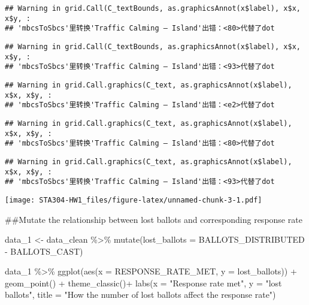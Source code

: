 \documentclass[
]{article}
\newenvironment{Shaded}{\begin{snugshade}}{\end{snugshade}}
\newcommand{\AttributeTok}[1]{\textcolor[rgb]{0.77,0.63,0.00}{#1}}
\newcommand{\FunctionTok}[1]{\textcolor[rgb]{0.00,0.00,0.00}{#1}}
\newcommand{\NormalTok}[1]{#1}
\newcommand{\OtherTok}[1]{\textcolor[rgb]{0.56,0.35,0.01}{#1}}
\newcommand{\SpecialCharTok}[1]{\textcolor[rgb]{0.00,0.00,0.00}{#1}}
\newcommand{\StringTok}[1]{\textcolor[rgb]{0.31,0.60,0.02}{#1}}
\begin{document}
\begin{verbatim}
## Warning in grid.Call(C_textBounds, as.graphicsAnnot(x$label), x$x, x$y, :
## 'mbcsToSbcs'里转换'Traffic Calming – Island'出错：<80>代替了dot
\end{verbatim}

\begin{verbatim}
## Warning in grid.Call(C_textBounds, as.graphicsAnnot(x$label), x$x, x$y, :
## 'mbcsToSbcs'里转换'Traffic Calming – Island'出错：<93>代替了dot
\end{verbatim}

\begin{verbatim}
## Warning in grid.Call.graphics(C_text, as.graphicsAnnot(x$label), x$x, x$y, :
## 'mbcsToSbcs'里转换'Traffic Calming – Island'出错：<e2>代替了dot
\end{verbatim}

\begin{verbatim}
## Warning in grid.Call.graphics(C_text, as.graphicsAnnot(x$label), x$x, x$y, :
## 'mbcsToSbcs'里转换'Traffic Calming – Island'出错：<80>代替了dot
\end{verbatim}

\begin{verbatim}
## Warning in grid.Call.graphics(C_text, as.graphicsAnnot(x$label), x$x, x$y, :
## 'mbcsToSbcs'里转换'Traffic Calming – Island'出错：<93>代替了dot
\end{verbatim}

\texttt{[image: STA304-HW1\_files/figure-latex/unnamed-chunk-3-1.pdf]}

\#\#Mutate the relationship between lost ballots and corresponding
response rate

\begin{Shaded}
\begin{Highlighting}[]
\NormalTok{data\_1 }\OtherTok{\textless{}{-}}\NormalTok{ data\_clean }\SpecialCharTok{\%\textgreater{}\%}
  \FunctionTok{mutate}\NormalTok{(}\AttributeTok{lost\_ballots =}\NormalTok{ BALLOTS\_DISTRIBUTED }\SpecialCharTok{{-}}\NormalTok{ BALLOTS\_CAST)}
\end{Highlighting}
\end{Shaded}

\begin{Shaded}
\begin{Highlighting}[]
\NormalTok{data\_1 }\SpecialCharTok{\%\textgreater{}\%} \FunctionTok{ggplot}\NormalTok{(}\FunctionTok{aes}\NormalTok{(}\AttributeTok{x =}\NormalTok{ RESPONSE\_RATE\_MET, }\AttributeTok{y =}\NormalTok{ lost\_ballots)) }\SpecialCharTok{+} \FunctionTok{geom\_point}\NormalTok{() }\SpecialCharTok{+} \FunctionTok{theme\_classic}\NormalTok{()}\SpecialCharTok{+} \FunctionTok{labs}\NormalTok{(}\AttributeTok{x =} \StringTok{"Response rate met"}\NormalTok{, }\AttributeTok{y =} \StringTok{"lost ballots"}\NormalTok{, }\AttributeTok{title =} \StringTok{"How the number of lost ballots affect the response rate"}\NormalTok{)}
\end{Highlighting}
\end{Shaded}
\end{document}
